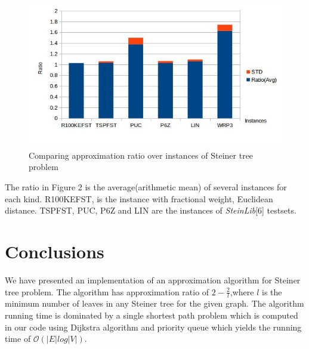 \documentclass[a4paper,10pt]{article}
\begin{document}
\begin{figure}[h]
\centering
\includegraphics[scale=0.4]{ratio.jpg}
\caption{Comparing approximation ratio over instances of Steiner tree problem}
\end{figure}
The ratio in Figure 2 is the average(arithmetic mean) of several instances for each kind.
R100KEFST, is the instance with fractional weight, Euclidean distance. TSPFST, PUC, P6Z and LIN are the instances of \emph{SteinLib}[6] testsets.

  

\section{Conclusions}
We have presented an implementation of an approximation algorithm for Steiner tree problem. The algorithm has approximation ratio of $2 - \frac{2}{l}$,where $ l $ is the minimum number of leaves in any Steiner tree for the given graph. The algorithm running time is dominated by a single shortest path problem which is computed in our code using Dijkstra algorithm and priority queue which yields the running time of $\mathcal{O}(|E|log|V|)$.   
\end{document}
